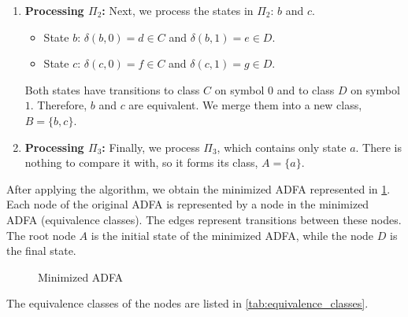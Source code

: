 \begin{example}
\begin{enumerate}
        \item \textbf{Processing $\Pi_2$:} Next, we process the states in $\Pi_2$: $b$ and $c$.
        \begin{itemize}
            \item State $b$: $\delta(b, 0) = d \in C$ and $\delta(b, 1) = e \in D$.
            \item State $c$: $\delta(c, 0) = f \in C$ and $\delta(c, 1) = g \in D$.
        \end{itemize}
        Both states have transitions to class $C$ on symbol $0$ and to class $D$ on symbol $1$. Therefore, $b$ and $c$ are equivalent. We merge them into a new class, $B = \{b, c\}$.

        \item \textbf{Processing $\Pi_3$:} Finally, we process $\Pi_3$, which contains only state $a$. There is nothing to compare it with, so it forms its class, $A = \{a\}$.
    \end{enumerate}

    After applying the algorithm, we obtain the minimized ADFA represented in \cref{fig:example_minimized_ADFA}. Each node of the original ADFA is represented by a node in the minimized ADFA (equivalence classes). The edges represent transitions between these nodes. The root node $A$ is the initial state of the minimized ADFA, while the node $D$ is the final state.
    
    \begin{figure}[H]
        \centering
        \caption{Minimized ADFA}
        \label{fig:example_minimized_ADFA}
    \end{figure}      

    The equivalence classes of the nodes are listed in \cref{tab:equivalence_classes}.
    

\end{example}
